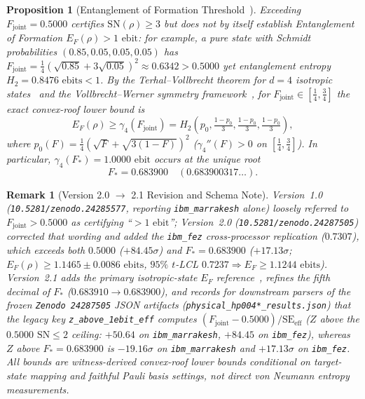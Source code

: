 \documentclass[11pt,twocolumn]{article}
\newtheorem{proposition}{Proposition}
\newtheorem{remark}{Remark}
\begin{document}
\begin{proposition}[Entanglement of Formation Threshold~\cite{TerhalVollbrecht2000,VollbrechtWerner2001}]
Exceeding $F_{\mathrm{joint}}=0.5000$ certifies $\mathrm{SN}(\rho)\ge 3$ but does \emph{not} by itself establish Entanglement of Formation $E_F(\rho)>1\text{ ebit}$: for example, a pure state with Schmidt probabilities $(0.85, 0.05, 0.05, 0.05)$ has $F_{\mathrm{joint}}=\frac{1}{4}(\sqrt{0.85}+3\sqrt{0.05})^2 \approx 0.6342 > 0.5000$ yet entanglement entropy $H_2 = 0.8476\text{ ebits} < 1$. By the Terhal--Vollbrecht theorem for $d=4$ isotropic states~\cite{TerhalVollbrecht2000} and the Vollbrecht--Werner symmetry framework~\cite{VollbrechtWerner2001}, for $F_{\mathrm{joint}}\in[\frac{1}{4},\frac{3}{4}]$ the exact convex-roof lower bound is
\begin{equation}
E_F(\rho) \ge \gamma_4(F_{\mathrm{joint}}) = H_2\!\left(p_0, \tfrac{1-p_0}{3}, \tfrac{1-p_0}{3}, \tfrac{1-p_0}{3}\right),
\label{eq:ef_bound}
\end{equation}
where $p_0(F) = \frac{1}{4}(\sqrt{F}+\sqrt{3(1-F)})^2$ ($\gamma_4''(F)>0$ on $[\frac{1}{4},\frac{3}{4}]$). In particular, $\gamma_4(F_*) = 1.0000\text{ ebit}$ occurs at the unique root
\begin{equation}
F_* = 0.683900\quad (0.683900317\ldots).
\label{eq:fstar}
\end{equation}
\end{proposition}

\begin{remark}[Version 2.0 $\to$ 2.1 Revision and Schema Note]
Version~1.0 (\texttt{10.5281/zenodo.24285577}, reporting \texttt{ibm\_marrakesh} alone) loosely referred to $F_{\mathrm{joint}}>0.5000$ as certifying ``$>1\text{ ebit}$''; Version~2.0 (\texttt{10.5281/zenodo.24287505}) corrected that wording and added the \texttt{ibm\_fez} cross-processor replication ($0.7307$), which exceeds both $0.5000$ ($+84.45\sigma$) and $F_*=0.683900$ ($+17.13\sigma$; $E_F(\rho)\ge 1.1465 \pm 0.0086\text{ ebits}$, $95\%$ $t$-LCL $0.7237 \Rightarrow E_F \ge 1.1244\text{ ebits}$). Version~2.1 adds the primary isotropic-state $E_F$ reference~\cite{TerhalVollbrecht2000}, refines the fifth decimal of $F_*$ ($0.683910 \to 0.683900$), and records for downstream parsers of the frozen \texttt{Zenodo 24287505} JSON artifacts (\texttt{physical\_hp004*\_results.json}) that the legacy key \texttt{z\_above\_1ebit\_eff} computes $(F_{\mathrm{joint}}-0.5000)/\mathrm{SE}_{\mathrm{eff}}$ ($Z$ above the $0.5000$ $\mathrm{SN}\le 2$ ceiling: $+50.64$ on \texttt{ibm\_marrakesh}, $+84.45$ on \texttt{ibm\_fez}), whereas $Z$ above $F_* = 0.683900$ is $-19.16\sigma$ on \texttt{ibm\_marrakesh} and $+17.13\sigma$ on \texttt{ibm\_fez}. All bounds are witness-derived convex-roof lower bounds conditional on target-state mapping and faithful Pauli basis settings, not direct von Neumann entropy measurements.
\end{remark}
\end{document}
